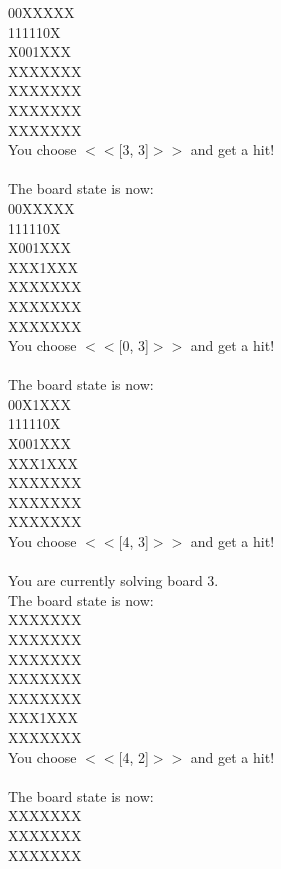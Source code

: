 \documentclass[pdflatex,sn-nature]{sn-jnl}%
\theoremstyle{thmstyleone}%
\theoremstyle{thmstyletwo}%
\theoremstyle{thmstylethree}%
\begin{document}
00XXXXX $~$\\ 
111110X $~$\\ 
X001XXX $~$\\ 
XXXXXXX $~$\\ 
XXXXXXX $~$\\ 
XXXXXXX $~$\\ 
XXXXXXX $~$\\ 
You choose $<<$[3, 3]$>>$ and get a hit! $~$\\ 
 $~$\\ 
The board state is now: $~$\\ 
00XXXXX $~$\\ 
111110X $~$\\ 
X001XXX $~$\\ 
XXX1XXX $~$\\ 
XXXXXXX $~$\\ 
XXXXXXX $~$\\ 
XXXXXXX $~$\\ 
You choose $<<$[0, 3]$>>$ and get a hit! $~$\\ 
 $~$\\ 
The board state is now: $~$\\ 
00X1XXX $~$\\ 
111110X $~$\\ 
X001XXX $~$\\ 
XXX1XXX $~$\\ 
XXXXXXX $~$\\ 
XXXXXXX $~$\\ 
XXXXXXX $~$\\ 
You choose $<<$[4, 3]$>>$ and get a hit! $~$\\ 
 $~$\\ 
You are currently solving board 3. $~$\\ 
The board state is now: $~$\\ 
XXXXXXX $~$\\ 
XXXXXXX $~$\\ 
XXXXXXX $~$\\ 
XXXXXXX $~$\\ 
XXXXXXX $~$\\ 
XXX1XXX $~$\\ 
XXXXXXX $~$\\ 
You choose $<<$[4, 2]$>>$ and get a hit! $~$\\ 
 $~$\\ 
The board state is now: $~$\\ 
XXXXXXX $~$\\ 
XXXXXXX $~$\\ 
XXXXXXX $~$\\ 
\end{document}
